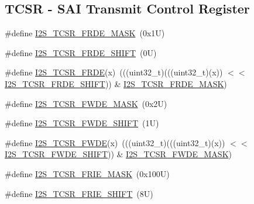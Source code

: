 \subsection*{T\+C\+SR -\/ S\+AI Transmit Control Register}
\begin{DoxyCompactItemize}
\item 
\#define \mbox{\hyperlink{group___i2_s___register___masks_gae565812ade16ef43b2c8de0da9434dc7}{I2\+S\+\_\+\+T\+C\+S\+R\+\_\+\+F\+R\+D\+E\+\_\+\+M\+A\+SK}}~(0x1\+U)
\item 
\#define \mbox{\hyperlink{group___i2_s___register___masks_ga625ff0e116f205afc5810d46b33889e8}{I2\+S\+\_\+\+T\+C\+S\+R\+\_\+\+F\+R\+D\+E\+\_\+\+S\+H\+I\+FT}}~(0\+U)
\item 
\#define \mbox{\hyperlink{group___i2_s___register___masks_ga39c433954a4c5379e414224a3739917f}{I2\+S\+\_\+\+T\+C\+S\+R\+\_\+\+F\+R\+DE}}(x)~(((uint32\+\_\+t)(((uint32\+\_\+t)(x)) $<$$<$ \mbox{\hyperlink{group___i2_s___register___masks_ga625ff0e116f205afc5810d46b33889e8}{I2\+S\+\_\+\+T\+C\+S\+R\+\_\+\+F\+R\+D\+E\+\_\+\+S\+H\+I\+FT}})) \& \mbox{\hyperlink{group___i2_s___register___masks_gae565812ade16ef43b2c8de0da9434dc7}{I2\+S\+\_\+\+T\+C\+S\+R\+\_\+\+F\+R\+D\+E\+\_\+\+M\+A\+SK}})
\item 
\#define \mbox{\hyperlink{group___i2_s___register___masks_ga1ee38c9bb8913b7ad39101588a3b6f81}{I2\+S\+\_\+\+T\+C\+S\+R\+\_\+\+F\+W\+D\+E\+\_\+\+M\+A\+SK}}~(0x2\+U)
\item 
\#define \mbox{\hyperlink{group___i2_s___register___masks_ga711259f1f84d00f66491a4369794c9be}{I2\+S\+\_\+\+T\+C\+S\+R\+\_\+\+F\+W\+D\+E\+\_\+\+S\+H\+I\+FT}}~(1\+U)
\item 
\#define \mbox{\hyperlink{group___i2_s___register___masks_ga521b14eeb19323fd1c1be8fc41244eac}{I2\+S\+\_\+\+T\+C\+S\+R\+\_\+\+F\+W\+DE}}(x)~(((uint32\+\_\+t)(((uint32\+\_\+t)(x)) $<$$<$ \mbox{\hyperlink{group___i2_s___register___masks_ga711259f1f84d00f66491a4369794c9be}{I2\+S\+\_\+\+T\+C\+S\+R\+\_\+\+F\+W\+D\+E\+\_\+\+S\+H\+I\+FT}})) \& \mbox{\hyperlink{group___i2_s___register___masks_ga1ee38c9bb8913b7ad39101588a3b6f81}{I2\+S\+\_\+\+T\+C\+S\+R\+\_\+\+F\+W\+D\+E\+\_\+\+M\+A\+SK}})
\item 
\#define \mbox{\hyperlink{group___i2_s___register___masks_gaa4df5fe488cb4d2acb0bfd546f660507}{I2\+S\+\_\+\+T\+C\+S\+R\+\_\+\+F\+R\+I\+E\+\_\+\+M\+A\+SK}}~(0x100\+U)
\item 
\#define \mbox{\hyperlink{group___i2_s___register___masks_gae80718274a142dbe1c9b84baddb880fe}{I2\+S\+\_\+\+T\+C\+S\+R\+\_\+\+F\+R\+I\+E\+\_\+\+S\+H\+I\+FT}}~(8\+U)

\end{DoxyCompactItemize}
